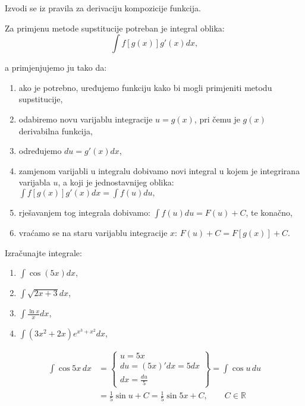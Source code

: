Izvodi se iz pravila za derivaciju kompozicije funkcija.

\bigskip
\noindent
Za primjenu metode supstitucije potreban je integral oblika:
$$
\int f[g(x)]g'(x)dx,
$$

\noindent
a primjenjujemo ju tako da:
\begin{enumerate}
    \item ako je potrebno, uređujemo funkciju kako bi mogli primjeniti metodu
    supstitucije,
    \item odabiremo novu varijablu integracije $u = g(x)$, pri čemu je $g(x)$
    derivabilna funkcija,
    \item određujemo $du = g'(x)dx$,
    \item zamjenom varijabli u integralu dobivamo novi integral u kojem je
    integrirana varijabla $u$, a koji je jednostavnijeg oblika: $\displaystyle
    \int f[g(x)]g'(x)dx = \int f(u)du,$
    \item rješavanjem tog integrala dobivamo: $\displaystyle \int f(u)du = F(u)
    + C$, te konačno,
    \item vraćamo se na staru varijablu integracije $x$: $F(u) + C = F[g(x)] +
    C.$
\end{enumerate}

\begin{example}
    Izračunajte integrale:
    \begin{enumerate}
        \item $\displaystyle \int \cos (5x) dx$,
        \item $\displaystyle \int \sqrt{2x + 3} dx$,
        \item $\displaystyle \int \frac{\ln x}{x} dx$,
        \item $\displaystyle \int (3x^2+2x)e^{x^3+x^2} dx$,
    \end{enumerate}
\end{example}

\begin{align*}
\int \cos 5x\,dx &= \begin{Bmatrix} u = 5x \\ du = (5x)'dx = 5dx \\ dx = \frac{du}{5} \end{Bmatrix} = \int \cos u\,du \\
                 &= \frac{1}{5}\sin u + C = \frac{1}{5}\sin 5x + C, \qquad C \in \mathbb{R}
\end{align*}
